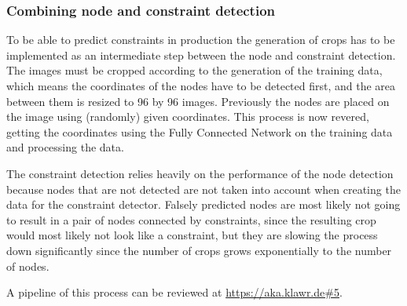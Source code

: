 \subsubsection{Combining node and constraint detection}

To be able to predict constraints in production the generation of crops has to be implemented as an intermediate step between the node and constraint detection.
The images must be cropped according to the generation of the training data, which means the coordinates of the nodes have to be detected first, and the area between them is resized to 96 by 96 images.
Previously the nodes are placed on the image using (randomly) given coordinates.
This process is now revered, getting the coordinates using the Fully Connected Network on the training data and processing the data.

The constraint detection relies heavily on the performance of the node detection because nodes that are not detected are not taken into account when creating the data for the constraint detector.
Falsely predicted nodes are most likely not going to result in a pair of nodes connected by constraints, since the resulting crop would most likely not look like a constraint, but they are slowing the process down significantly since the number of crops grows exponentially to the number of nodes.

A pipeline of this process can be reviewed at \url{https://aka.klawr.de\#5}.

